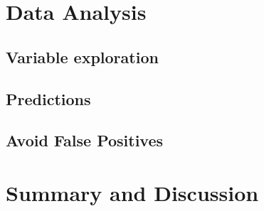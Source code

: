\documentclass[12 pt]{scrartcl}
\begin{document}
\section{Data Analysis}





\subsection{Variable exploration}




\subsection{Predictions}




\subsection{Avoid False Positives}


\section{Summary and Discussion}


\newpage
{}
\renewcommand\refname{Bibliography}


\end{document}

